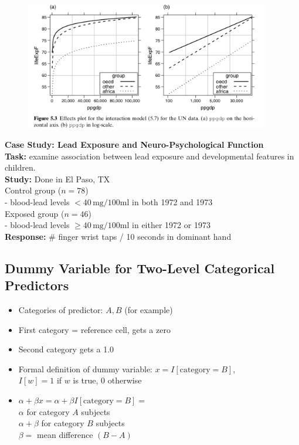 \documentclass[14pt]{extarticle}
\begin{document}
\begin{figure}[H]
    \centering
    \includegraphics[width=0.95\textwidth]{fig24.png}
\end{figure}
\noindent
\textbf{Case Study: Lead Exposure and Neuro-Psychological Function}\\
\textbf{Task:} examine association between lead exposure and developmental features in children.\\
\textbf{Study:} Done in El Paso, TX\\
    Control group ($n = 78$)\\
    - blood-lead levels $< 40 \, \text{mg/100ml}$ in both 1972 and 1973\\
    Exposed group ($n = 46$)\\
     - blood-lead levels $\geq 40 \, \text{mg/100ml}$ in either 1972 or 1973\\
\textbf{Response:} \# finger wrist taps / 10 seconds in dominant hand\\

\subsection*{Dummy Variable for Two-Level Categorical Predictors}
\begin{itemize}
    \item Categories of predictor: $A, B$ (for example)
    \item First category = reference cell, gets a zero
    \item Second category gets a 1.0
    \item Formal definition of dummy variable: $x = I[\text{category} = B]$, \\$I[w] = 1$ if $w$ is true, 0 otherwise
    \item $\alpha + \beta x = \alpha + \beta I[\text{category} = B] =$\\
        $\alpha$ for category $A$ subjects\\
        $\alpha + \beta$ for category $B$ subjects\\
        $\beta =$ mean difference $(B - A)$
\end{itemize}
\end{document}
